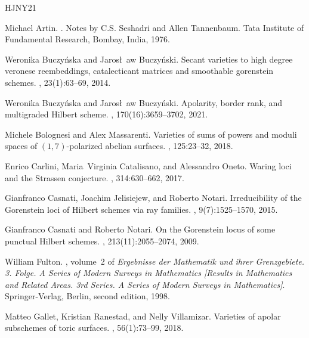 \documentclass{amsart}
\begin{document}
%
%
\begin{thebibliography}{HJNY21}

Michael Artin.
.
\newblock Notes by C.S. Seshadri and Allen Tannenbaum. Tata Institute of
  Fundamental Research, Bombay, India, 1976.

Weronika Buczy\'{n}ska and Jaros\l~aw Buczy\'{n}ski.
\newblock Secant varieties to high degree veronese reembeddings, catalecticant
  matrices and smoothable gorenstein schemes.
, 23(1):63--69, 2014.

Weronika Buczy\'{n}ska and Jaros\l~aw Buczy\'{n}ski.
\newblock Apolarity, border rank, and multigraded {H}ilbert scheme.
, 170(16):3659--3702, 2021.

Michele Bolognesi and Alex Massarenti.
\newblock Varieties of sums of powers and moduli spaces of {$(1,7)$}-polarized
  abelian surfaces.
, 125:23--32, 2018.

Enrico Carlini, Maria~Virginia Catalisano, and Alessandro Oneto.
\newblock Waring loci and the {S}trassen conjecture.
, 314:630--662, 2017.

Gianfranco Casnati, Joachim Jelisiejew, and Roberto Notari.
\newblock Irreducibility of the {G}orenstein loci of {H}ilbert schemes via ray
  families.
, 9(7):1525--1570, 2015.

Gianfranco Casnati and Roberto Notari.
\newblock On the {G}orenstein locus of some punctual {H}ilbert schemes.
, 213(11):2055--2074, 2009.

William Fulton.
, volume~2 of {\em Ergebnisse der Mathematik
  und ihrer Grenzgebiete. 3. Folge. A Series of Modern Surveys in Mathematics
  [Results in Mathematics and Related Areas. 3rd Series. A Series of Modern
  Surveys in Mathematics]}.
\newblock Springer-Verlag, Berlin, second edition, 1998.

Matteo Gallet, Kristian Ranestad, and Nelly Villamizar.
\newblock Varieties of apolar subschemes of toric surfaces.
, 56(1):73--99, 2018.


\end{thebibliography}
\end{document}
